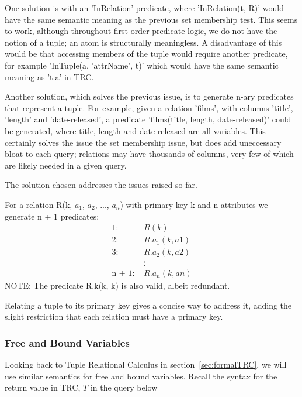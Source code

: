 \documentclass[a4paper, 11pt]{article}
\begin{document}
      One solution is with an 'InRelation' predicate, where 'InRelation(t, R)'
      would have the same semantic meaning as the previous set membership test.
      This seems to work, although throughout first order predicate logic, we
      do not have the notion of a tuple; an atom is structurally meaningless. A
      disadvantage of this would be that accessing members of the tuple would
      require another predicate, for example 'InTuple(a, 'attrName', t)' which
      would have the same semantic meaning as 't.a' in TRC.

      Another solution, which solves the previous issue, is to generate n-ary
      predicates that represent a tuple. For example, given a relation 'films',
      with columns 'title', 'length' and 'date-released', a predicate
      'films(title, length, date-released)' could be generated, where title,
      length and date-released are all variables. This certainly solves the
      issue the set membership issue, but does add uneccessary bloat to each
      query; relations may have thousands of columns, very few of which are
      likely needed in a given query.

      The solution chosen addresses the issues raised so far.

      For a relation R(k, $a_{1}$, $a_{2}$, ..., $a_{n}$) with primary key k
      and n attributes we generate n + 1 predicates:
      \begin{align*}
        \text{1:  }     & R(k)           \\
        \text{2:  }     & R.a_1(k, a1)   \\
        \text{3:  }     & R.a_2(k, a2)   \\
                        & \vdots         \\
        \text{n + 1:  }  & R.a_n(k, an)
      \end{align*}
      NOTE: The predicate R.k(k, k) is also valid, albeit redundant.

      Relating a tuple to its primary key gives a concise way to address it,
      adding the slight restriction that each relation must have a primary key.

    \subsubsection{Free and Bound Variables}
    \label{sec:freebound}

      Looking back to Tuple Relational Calculus in
      section~\ref{sec:formalTRC}, we will use similar semantics for free and
      bound variables. Recall the syntax for the return value in TRC, $T$ in the
      query below
\end{document}
